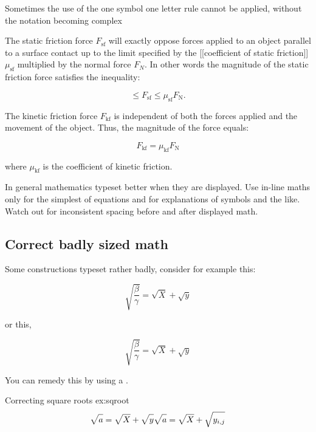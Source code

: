 {Sometimes the use of the one symbol one letter rule cannot be applied, without the notation becoming complex
\medskip

{
\narrower\narrower
The static friction force \(F_{\mathrm{sf}}\) will exactly oppose forces applied to an object parallel to a surface contact up to the limit specified by the [[coefficient of static friction]] \(\mu_{\mathrm{sf}}\) multiplied by the normal force \(F_N\). In other words the magnitude of the static friction force satisfies the inequality:

\[ \le F_{\mathrm{sf}} \le \mu_{\mathrm{sf}} F_\mathrm{N}. \]

The kinetic friction force \(F_{\mathrm{kf}}\) is independent of both the forces applied and the movement of the object. Thus, the magnitude of the force equals:

\[F_{\mathrm{kf}} = \mu_{\mathrm{kf}} F_\mathrm{N}\]

where \(\mu_{\mathrm{kf}}\) is the coefficient of kinetic friction.
}






In general mathematics typeset better when they are displayed. Use in-line maths only for the simplest of equations and for explanations of symbols and the like. Watch out for inconsistent spacing before and after displayed math.

\subsection{Correct badly sized math}

Some \tex constructions typeset rather badly, consider for example this:

\[
\sqrt{\frac{\beta}{\gamma}} = \sqrt{X} + \sqrt{y}
\]

\noindent or this,

\[
\surd{\frac{\beta}{\gamma}} = \surd{X} + \surd{y}
\]


You can remedy this by using a .


\begin{texexample} {Correcting square roots} {ex:sqroot}
\[
\sqrt{\mathstrut a}=\sqrt{\mathstrut X}+\sqrt{\mathstrut y}
\sqrt{\mathstrut a}=\sqrt{\mathstrut X}+\sqrt{\mathstrut y_{i,j}}
\]
\end{texexample}



}
